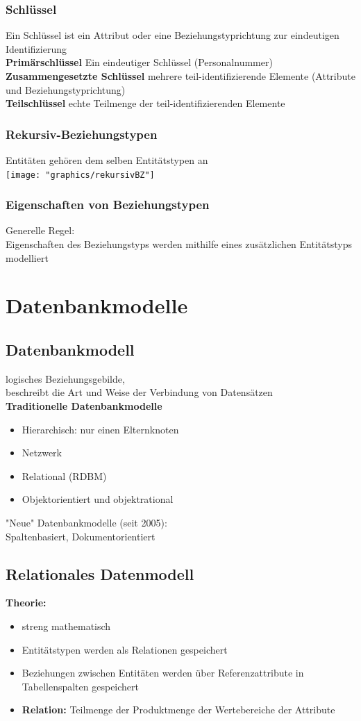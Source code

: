 \documentclass{scrreprt}
\begin{document}
\subsection{Schlüssel}
Ein Schlüssel ist ein Attribut oder eine Beziehungstyprichtung zur eindeutigen Identifizierung
\\\textbf{Primärschlüssel}
Ein eindeutiger Schlüssel (Personalnummer)
\\\textbf{Zusammengesetzte Schlüssel}
mehrere teil-identifizierende Elemente (Attribute und Beziehungstyprichtung)
\\\textbf{Teilschlüssel}
echte Teilmenge der teil-identifizierenden Elemente
\subsection{Rekursiv-Beziehungstypen}
Entitäten gehören dem selben Entitätstypen an
\\\texttt{[image: "graphics/rekursivBZ"]}
\subsection{Eigenschaften von Beziehungstypen}
Generelle Regel:
\\Eigenschaften des Beziehungstyps werden mithilfe eines zusätzlichen Entitätstyps modelliert
\pagebreak
\chapter{Datenbankmodelle}
\section{Datenbankmodell}
logisches Beziehungsgebilde,
\\beschreibt die Art und Weise der Verbindung von Datensätzen
\\\textbf{Traditionelle Datenbankmodelle}
\begin{itemize}
  \item Hierarchisch: nur einen Elternknoten
  \item Netzwerk
  \item Relational (RDBM)
  \item Objektorientiert und objektrational
\end{itemize}
"Neue" Datenbankmodelle (seit 2005):
\\Spaltenbasiert, Dokumentorientiert
\section{Relationales Datenmodell}
\textbf{Theorie:}
\begin{itemize}
  \item streng mathematisch
  \item Entitätstypen werden als Relationen gespeichert
  \item Beziehungen zwischen Entitäten werden über Referenzattribute in Tabellenspalten gespeichert
  \item \textbf{Relation:} Teilmenge der Produktmenge der Wertebereiche der Attribute
\end{itemize}
\end{document}
